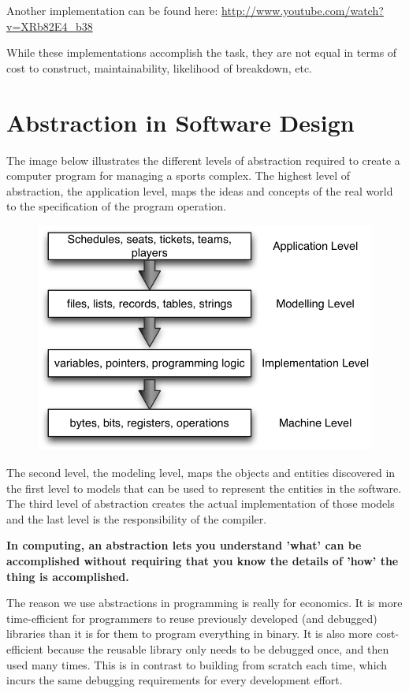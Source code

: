 Another implementation can be found here:  \url{http://www.youtube.com/watch?v=XRb82E4_b38}

While these implementations accomplish the task, they are not equal in terms of cost to construct, maintainability, likelihood of breakdown, etc.



\section{Abstraction in Software Design}

The image below illustrates the different levels of abstraction required to create a computer program for managing a sports complex. The highest level of abstraction, the application level, maps the ideas and concepts of the real world to the specification of the program operation.

\begin{figure}[H]
\centering
\includegraphics{pictures/abstraction01.png}
\label{fig:sportsComplex}
\end{figure}

The second level, the modeling level, maps the objects and entities discovered in the first level to models that can be used to represent the entities in the software. The third level of abstraction creates the actual implementation of those models and the last level is the responsibility of the compiler.

\textbf{In computing, an abstraction lets you understand 'what' can be accomplished without requiring that you know the details of 'how' the thing is accomplished.}

The reason we use abstractions in programming is really for economics. It is more time-efficient for programmers to reuse previously developed (and debugged) libraries than it is for them to program everything in binary. It is also more cost-efficient because the reusable library only needs to be debugged once, and then used many times. This is in contrast to building from scratch each time, which incurs the same debugging requirements for every development effort.

